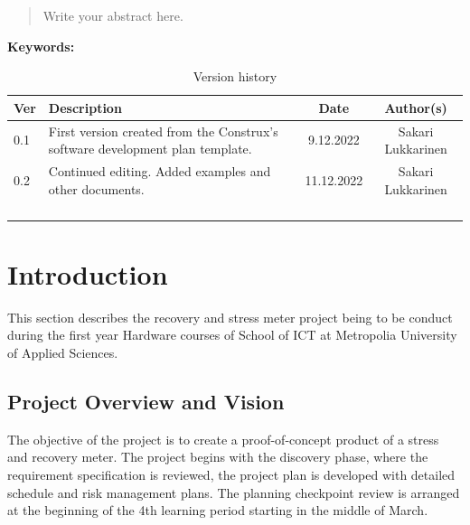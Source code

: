 \documentclass{article}
\begin{document}
\newpage

\begin{abstract}
Write your abstract here.
\end{abstract}




\begin{center}
\textbf{\large Keywords:}
\end{center}

\vspace{1cm}

\begin{table}[h]
\centering
\begin{tabular}{|p{1cm}|p{4cm}|c|c|}
\hline
\textbf{Ver} & \textbf{Description} & \textbf{Date} & \textbf{Author(s)} \\ \hline
0.1 & First version created from the Construx's software development plan template. & 9.12.2022 & Sakari Lukkarinen \\ \hline
0.2 & Continued editing. Added examples and other documents. & 11.12.2022 & Sakari Lukkarinen \\ \hline
 &  &  &  \\ \hline
 &  &  &  \\ \hline
 &  &  &  \\ \hline
 &  &  &  \\ \hline
\end{tabular}
\caption{Version history}
\label{table:version-history}
\end{table}

\begin{bf}
\begin{center}
\end{center}
\end{bf}

\newpage

\tableofcontents

\section{Introduction}
This section describes the recovery and stress meter project being to be
conduct during the first year Hardware courses of School of ICT at Metropolia
University of Applied Sciences.



\subsection{Project Overview and Vision}
The objective of the project is to create a proof-of-concept product of a stress and
recovery meter. The project begins with the discovery phase, where the
requirement specification is reviewed, the project plan is developed with detailed
schedule and risk management plans. The planning checkpoint review is
arranged at the beginning of the 4th learning period starting in the middle of
March.
\end{document}
